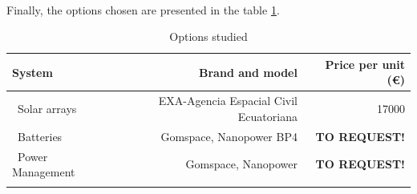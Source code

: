 \paragraph{}Finally, the options chosen are presented in the table \ref{epsfinal}.

\begin{longtable}{| l | r | r | }
\hline
\rowcolor[gray]{0.80}	\textbf{System} &  \textbf{Brand and model}     & \textbf{Price per unit (\euro)}   \\
\hline
\endfirsthead

	   ~Solar arrays & EXA-Agencia Espacial Civil Ecuatoriana & 17000 \\
	   ~Batteries & Gomspace, Nanopower BP4 & \textbf{TO REQUEST!} \\
	   ~Power Management & Gomspace, Nanopower & \textbf{TO REQUEST!} \\
	\hline

\caption{Options studied}
\label{epsfinal}
\end{longtable}